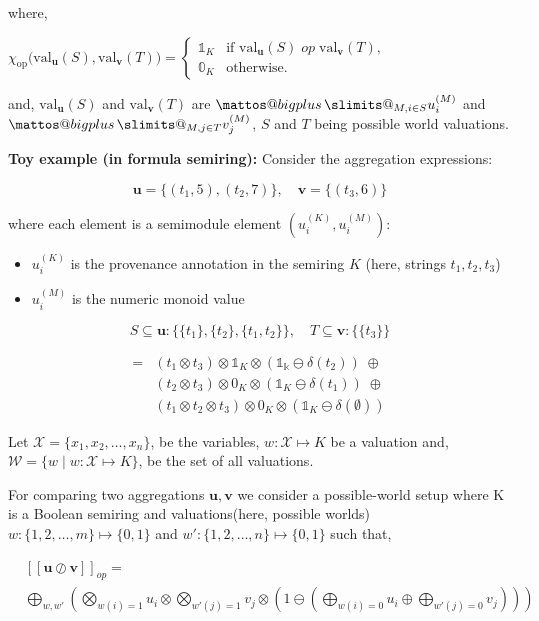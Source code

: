\documentclass[twocolumn]{article}
\makeatletter
\newcommand{\bigplus}{%
  \DOTSB\mathop{\mathpalette\mattos@bigplus\relax}\slimits@
}
\newcommand\mattos@bigplus[2]{%
  \vcenter{\hbox{%
    \sbox\z@{$#1\sum$}%
    \resizebox{!}{0.9\dimexpr\ht\z@+\dp\z@}{\raisebox{\depth}{$\m@th#1+$}}%
  }}%
  \vphantom{\sum}%
}
\makeatother
\begin{document}
where,

$\chi_{\mathrm{op}}\bigl(\mathrm{val}_\mathbf{u}(S), \mathrm{val}_\mathbf{v}(T)\bigr)=\begin{cases}
\mathbb{1}_K & \text{if } \mathrm{val}_\mathbf{u}(S) \;\mathit{op}\; \mathrm{val}_\mathbf{v}(T),\\
\mathbb{0}_K & \text{otherwise.}
\end{cases}$ 

and, 
$\mathrm{val}_\mathbf{u}(S)$ and $\mathrm{val}_\mathbf{v}(T)$ are $\bigplus_{M, i \in S}u_i^{(M)}$  and 
$\bigplus_{M, j \in T}v_j^{(M)}$, $S$ and $T$ being possible world valuations.

\textbf{Toy example (in formula semiring):}
Consider the aggregation expressions:

\[
\mathbf{u} = \{ (t_1,5), (t_2,7) \}, \quad
\mathbf{v} = \{ (t_3,6) \}
\]

where each element is a semimodule element $(u_i^{(K)}, u_i^{(M)})$:

\begin{itemize}
    \item $u_i^{(K)}$ is the provenance annotation in the semiring $K$ (here, strings $t_1, t_2, t_3$)
    \item $u_i^{(M)}$ is the numeric monoid value
\end{itemize}
\[
S \subseteq \mathbf{u}: \{ \{t_1\}, \{t_2\}, \{t_1,t_2\} \}, \quad
T \subseteq \mathbf{v}: \{ \{t_3\} \}
\]

\begin{align*}
[\mathbf{u} \oslash_{<} \mathbf{v}]
= 
&(t_1 \otimes t_3) \otimes \mathbb{1}_K \otimes (\mathbb{1_k}\ominus\delta(t_2)) 
\;\oplus\;\\ 
&(t_2 \otimes t_3) \otimes 0_K \otimes (\mathbb{1}_K\ominus\delta(t_1)) 
\;\oplus\;\\
&(t_1 \otimes t_2 \otimes t_3) \otimes 0_K \otimes (\mathbb{1}_K\ominus\delta(\emptyset))
\end{align*}


Let $\mathcal{X} = \{x_1, x_2, \dots, x_n\}$, be the variables, $w: \mathcal{X} \mapsto K$ be a valuation and,
$\mathcal{W} = \{w \mid w:\mathcal{X} \mapsto K\}$, be the set of all valuations.

For comparing two aggregations $\mathbf{u},\mathbf{v}$ we consider a possible-world setup where K is a Boolean semiring and valuations(here, possible worlds)
$w: \{1,2,\dots,m\} \mapsto \{0,1\}$ and $w': \{1,2,\dots,n\} \mapsto \{0,1\}$ such that, 

\begin{align*}
  &[[\mathbf{u} \oslash \mathbf{v}]]_{op}=\\
  &\bigoplus_{w,w'}\left(\bigotimes_{w(i)=1}u_i\otimes\bigotimes_{w'(j) = 1}v_j\otimes\left(1\ominus(\bigoplus_{w(i) =0}u_i\oplus \bigoplus_{w'(j) = 0}v_j)\right)\right)
\end{align*}
\end{document}
